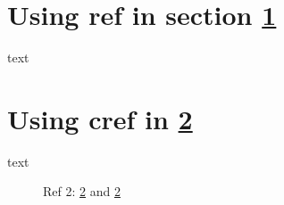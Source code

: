\documentclass{article}
\begin{document}
\begin{itemize}
	\end{itemize}
	\section{Using ref in section \ref{i1}}\label{i1} text
	\section{Using cref in \cref{i2}}\label{i2} text
	\begin{figure}
		\caption{Ref 2: \cref{i2} and \ref{i2}}
	\end{figure}
\tableofcontents
\listoffigures
\end{document}
